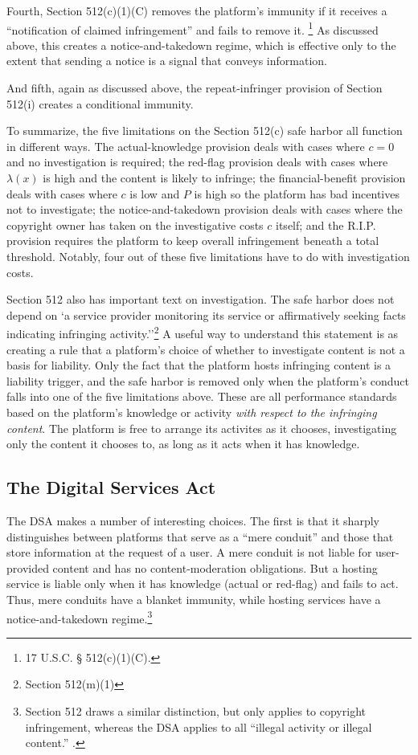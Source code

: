 Fourth, Section 512(c)(1)(C) removes the platform's immunity if it receives a ``notification of claimed infringement'' and fails to remove it.
\footnote{17 U.S.C. § 512(c)(1)(C).} As discussed above, this creates a notice-and-takedown regime, which is effective only to the extent that sending a notice is a signal that conveys information.

And fifth, again as discussed above, the repeat-infringer provision of Section 512(i) creates a conditional immunity.

To summarize, the five limitations on the Section 512(c) safe harbor all function in different ways. The actual-knowledge provision deals with cases where $c = 0$ and no investigation is required; the red-flag provision deals with cases where $\lambda(x)$ is high and the content is likely to infringe; the financial-benefit provision deals with cases where $c$ is low and $P$ is high so the platform has bad incentives not to investigate; the notice-and-takedown provision deals with cases where the copyright owner has taken on the investigative costs $c$ itself; and the R.I.P. provision requires the platform to keep overall infringement beneath a total threshold. Notably, four out of these five limitations have to do with investigation costs.

Section 512 also has important text on investigation. The safe harbor does not depend on `a service provider monitoring its service or affirmatively seeking facts indicating infringing activity.''\footnote{Section 512(m)(1)} A useful way to understand this statement is as creating a rule that a platform's choice of whether to investigate content is not a basis for liability. Only the fact that the platform hosts infringing content is a liability trigger, and the safe harbor is removed only when the platform's conduct falls into  one of the five limitations above. These are all performance standards based on the platform's knowledge or activity \emph{with respect to the infringing content}. The platform is free to arrange its activites as it chooses, investigating only the content it chooses to, as long as it acts when it has knowledge.

\subsection{The Digital Services Act}

The DSA makes a number of interesting choices. The first is that it sharply distinguishes between platforms that serve as a ``mere conduit'' and those that store information at the request of a user. A mere conduit is not liable for user-provided content and has no content-moderation obligations. But a hosting service is liable only when it has knowledge (actual or red-flag) and fails to act. Thus, mere conduits have a blanket immunity, while hosting services have a notice-and-takedown regime.\footnote{Section 512 draws a similar distinction, but only applies to copyright infringement, whereas the DSA applies to all ``illegal activity or illegal content.'' .}

